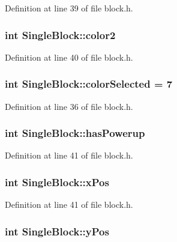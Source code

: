 Definition at line 39 of file block.h.\hypertarget{class_single_block_a7a5875f9554dd6de80abcdaf056d0e28}{
\subsubsection[{color2}]{\setlength{\rightskip}{0pt plus 5cm}int {\bf SingleBlock::color2}}}
\label{class_single_block_a7a5875f9554dd6de80abcdaf056d0e28}


Definition at line 40 of file block.h.\hypertarget{class_single_block_a2982e7fec926fadd304d275ea37f819b}{
\subsubsection[{colorSelected}]{\setlength{\rightskip}{0pt plus 5cm}int {\bf SingleBlock::colorSelected} = 7}}
\label{class_single_block_a2982e7fec926fadd304d275ea37f819b}


Definition at line 36 of file block.h.\hypertarget{class_single_block_a98b56c58cfbb12b6e7dbcc744d006082}{
\subsubsection[{hasPowerup}]{\setlength{\rightskip}{0pt plus 5cm}int {\bf SingleBlock::hasPowerup}}}
\label{class_single_block_a98b56c58cfbb12b6e7dbcc744d006082}


Definition at line 41 of file block.h.\hypertarget{class_single_block_ac542150d68ae2ca631d0bfb6a30ef31b}{
\subsubsection[{xPos}]{\setlength{\rightskip}{0pt plus 5cm}int {\bf SingleBlock::xPos}}}
\label{class_single_block_ac542150d68ae2ca631d0bfb6a30ef31b}


Definition at line 41 of file block.h.\hypertarget{class_single_block_aa57935921db04eb8d4971a6b1351d4d8}{
\subsubsection[{yPos}]{\setlength{\rightskip}{0pt plus 5cm}int {\bf SingleBlock::yPos}}}
\label{class_single_block_aa57935921db04eb8d4971a6b1351d4d8}


